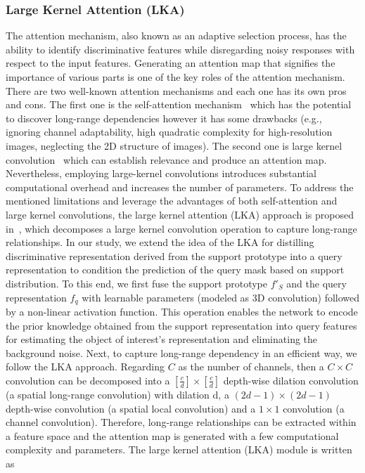 \documentclass[runningheads]{llncs}
\begin{document}
\subsubsection{Large Kernel Attention (LKA)}
The attention mechanism, also known as an adaptive selection process, has the ability to identify discriminative features while disregarding noisy responses with respect to the input features. Generating an attention map that signifies the importance of various parts is one of the key roles of the attention mechanism. There are two well-known attention mechanisms and each one has its own pros and cons. The first one is the self-attention mechanism~\cite{dosovitskiy2020image} which has the potential to discover long-range dependencies however it has some drawbacks (e.g., ignoring channel adaptability, high quadratic complexity for high-resolution images, neglecting the 2D structure of images). The second one is large kernel convolution~\cite{park2018bam} which can establish relevance and produce an attention map. Nevertheless, employing large-kernel convolutions introduces substantial computational overhead and increases the number of parameters. To address the mentioned limitations and leverage the advantages of both self-attention and large kernel convolutions, the large kernel attention (LKA) approach is proposed in~\cite{guo2022visual}, which decomposes a large kernel convolution operation to capture long-range relationships.
In our study, we extend the idea of the LKA for distilling discriminative representation derived from the support prototype into a query representation to condition the prediction of the query mask based on support distribution. To this end, we first fuse the support prototype $f'_S$ and the query representation $f_q$ with learnable parameters (modeled as 3D convolution) followed by a non-linear activation function. This operation enables the network to encode the prior knowledge obtained from the support representation into query features for estimating the object of interest's representation and eliminating the background noise. Next, to capture long-range dependency in an efficient way, we follow the LKA approach. Regarding $C$ as the number of channels, then a $C \times C$ convolution can be decomposed into a $[\frac{c}{d}]\times [\frac{c}{d}]$ depth-wise dilation convolution (a spatial long-range convolution) with dilation d, a $(2d-1)\times(2d-1)$ depth-wise convolution (a spatial local convolution) and a $1\times1$ convolution (a channel convolution). Therefore, long-range relationships can be extracted within a feature space and the attention map is generated with a few computational complexity and parameters. The large kernel attention (LKA) module is written as
\end{document}
